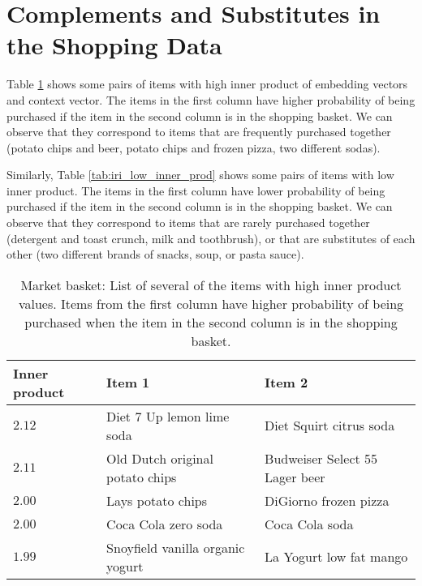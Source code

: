 \documentclass[12pt]{article}
\begin{document}
\newpage
\section{Complements and Substitutes in the Shopping Data}
\label{sec:complements_substitutes}

Table \ref{tab:iri_high_inner_prod} shows some pairs of items with high inner product of embedding vectors and context vector. The items in the first column have higher probability of being purchased if the item in the second column is in the shopping basket. We can observe that they correspond to items that are frequently purchased together (potato chips and beer, potato chips and frozen pizza, two different sodas).

Similarly, Table \ref{tab:iri_low_inner_prod} shows some pairs of items with low inner product. The items in the first column have lower probability of being purchased if the item in the second column is in the shopping basket. We can observe that they correspond to items that are rarely purchased together (detergent and toast crunch, milk and toothbrush), or that are substitutes of each other (two different brands of snacks, soup, or pasta sauce).

\begin{table}[h]
	\centering
  \scriptsize
	\begin{tabular}{lll}\toprule
		Inner product & Item 1 & Item 2 \\ \hline
    $2.12$ & Diet 7 Up lemon lime soda & Diet Squirt citrus soda \\
    $2.11$ & Old Dutch original potato chips & Budweiser Select 55 Lager beer \\
    $2.00$ & Lays potato chips & DiGiorno frozen pizza \\
    $2.00$ & Coca Cola zero soda & Coca Cola soda \\
    $1.99$ & Snoyfield vanilla organic yogurt & La Yogurt low fat mango \\
		\bottomrule
	\end{tabular}
	\caption{Market basket: List of several of the items with high inner product values. Items from the first column have higher probability of being purchased when the item in the second column is in the shopping basket.\label{tab:iri_high_inner_prod}}
\end{table}
\end{document}
